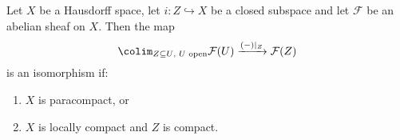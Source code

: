 \begin{prop}\label{prop:restriction-map-isomorphism-paracompact}
Let \(X\) be a Hausdorff space, let \(i\colon Z\hookrightarrow X\) be a closed subspace and let \(\mathcal F\) be an abelian sheaf on \(X\).
Then the map
\begin{equation}
  \label{eq:restriction-map-isomorphism-paracompact}
  \colim_{Z\subseteq U\text{, }U\textup{ open}}\mathcal F(U) \xrightarrow{(-)|_Z} \mathcal F(Z)
\end{equation}
is an isomorphism if:
\begin{enumerate}
\item\label{prop:restriction-map-isomorphism-paracompact:paracompact} \(X\) is paracompact, or
\item\label{prop:restriction-map-isomorphism-paracompact:locally-compact} \(X\) is locally compact and \(Z\) is compact.
\end{enumerate}
\end{prop}
